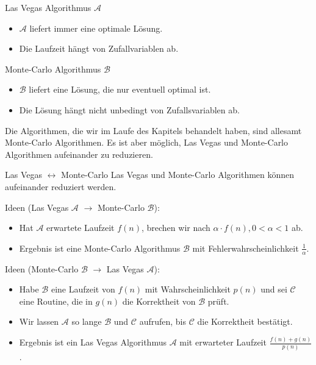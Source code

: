 \documentclass{panikzettel}
\begin{document}
\begin{halfboxl}
\vspace{-\baselineskip}
\begin{defi}{Las Vegas Algorithmus $\mathcal{A}$}
\begin{itemize}[leftmargin=*]
    \item $\mathcal{A}$ liefert immer eine optimale Lösung.
    \item Die Laufzeit hängt von Zufallvariablen ab.
\end{itemize}
\end{defi}
\end{halfboxl}%
\begin{halfboxr}
\vspace{-\baselineskip}
\begin{defi}{Monte-Carlo Algorithmus $\mathcal{B}$}
\begin{itemize}[leftmargin=*]
    \item $\mathcal{B}$ liefert eine Lösung, die nur eventuell optimal ist.
    \item Die Lösung hängt nicht unbedingt von Zufallsvariablen ab.
\end{itemize}
\end{defi}
\end{halfboxr}

Die Algorithmen, die wir im Laufe des Kapitels behandelt haben, sind allesamt Monte-Carlo Algorithmen. Es ist aber möglich, Las Vegas und Monte-Carlo Algorithmen aufeinander zu reduzieren.

\begin{theo}{Las Vegas $\leftrightarrow$ Monte-Carlo}
Las Vegas und Monte-Carlo Algorithmen können aufeinander reduziert werden.
\end{theo}

Ideen (Las Vegas $\mathcal{A}$ $\to$ Monte-Carlo $\mathcal{B}$):
\begin{itemize}
    \item Hat $\mathcal{A}$ erwartete Laufzeit $f(n)$, brechen wir nach $\alpha \cdot f(n), 0 < \alpha < 1$ ab.
    \item Ergebnis ist eine Monte-Carlo Algorithmus $\mathcal{B}$ mit Fehlerwahrscheinlichkeit $\frac{1}{\alpha}$.
\end{itemize}

Ideen (Monte-Carlo $\mathcal{B}$ $\to$ Las Vegas $\mathcal{A}$):
\begin{itemize}
    \item Habe $\mathcal{B}$ eine Laufzeit von $f(n)$ mit Wahrscheinlichkeit $p(n)$ und sei $\mathcal{C}$ eine Routine, die in $g(n)$ die Korrektheit von $\mathcal{B}$ prüft.
    \item Wir lassen $\mathcal{A}$ so lange $\mathcal{B}$ und $\mathcal{C}$ aufrufen, bis $\mathcal{C}$ die Korrektheit bestätigt.
    \item Ergebnis ist ein Las Vegas Algorithmus $\mathcal{A}$ mit erwarteter Laufzeit $\frac{f(n)+g(n)}{p(n)}$.
\end{itemize}
\end{document}
